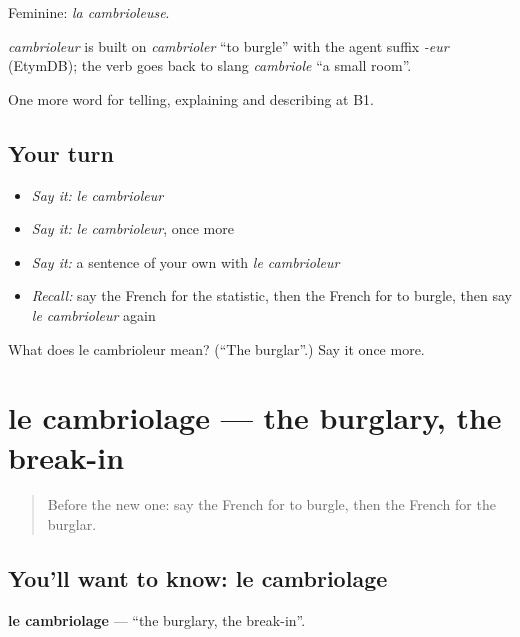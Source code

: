Feminine: \emph{la cambrioleuse}.

\begin{cousinweb}
\emph{cambrioleur} is built on \emph{cambrioler} \textquotedblleft{}to burgle\textquotedblright{} with the agent suffix \emph{-eur} (EtymDB); the verb goes back to slang \emph{cambriole} \textquotedblleft{}a small room\textquotedblright{}.
\end{cousinweb}

\begin{grammarlens}[title={What you've built}]
One more word for telling, explaining and describing at B1.
\end{grammarlens}

\subsection*{Your turn}
\begin{itemize}
\raggedright
  \item \emph{Say it:} \emph{le cambrioleur}
  \item \emph{Say it:} \emph{le cambrioleur}, once more
  \item \emph{Say it:} a sentence of your own with \emph{le cambrioleur}
  \item \emph{Recall:} say the French for the statistic, then the French for to burgle, then say \emph{le cambrioleur} again
\end{itemize}

\begin{tcolorbox}[breakable,colback=teal!4,colframe=teal!35!black,title={Before you move on}]
What does le cambrioleur mean? (\textquotedblleft{}The burglar\textquotedblright{}.) Say it once more.
\end{tcolorbox}
\section[le cambriolage]{le cambriolage — the burglary, the break-in}

\label{lesson:FR-C287-cambriolage}



\begin{quote}
Before the new one: say the French for to burgle, then the French for the burglar.
\end{quote}

\subsection*{You'll want to know: le cambriolage}
\textbf{le cambriolage} — \textquotedblleft{}the burglary, the break-in\textquotedblright{}.

